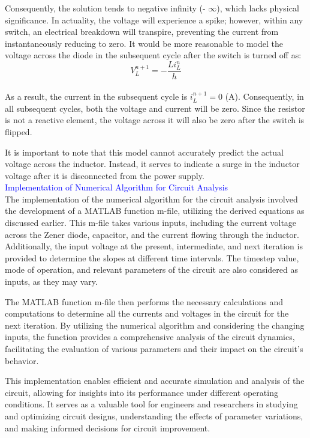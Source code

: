 Consequently, the solution tends to negative infinity (- $\infty$), which lacks physical significance. In actuality, the voltage will experience a spike; however, within any switch, an electrical breakdown will transpire, preventing the current from instantaneously reducing to zero. It would be more reasonable to model the voltage across the diode in the subsequent cycle after the switch is turned off as:\\

\begin{equation}
    V^{n+1}_L = -\frac{Li^{n}_L}{h}
\end{equation}\\

As a result, the current in the subsequent cycle is $i_L^{n+1} = 0$ (A). Consequently, in all subsequent cycles, both the voltage and current will be zero. Since the resistor is not a reactive element, the voltage across it will also be zero after the switch is flipped.

It is important to note that this model cannot accurately predict the actual voltage across the inductor. Instead, it serves to indicate a surge in the inductor voltage after it is disconnected from the power supply.\\

\textcolor{blue}{Implementation of Numerical Algorithm for Circuit Analysis}\\

The implementation of the numerical algorithm for the circuit analysis involved the development of a MATLAB function m-file, utilizing the derived equations as discussed earlier. This m-file takes various inputs, including the current voltage across the Zener diode, capacitor, and the current flowing through the inductor. Additionally, the input voltage at the present, intermediate, and next iteration is provided to determine the slopes at different time intervals. The timestep value, mode of operation, and relevant parameters of the circuit are also considered as inputs, as they may vary.

The MATLAB function m-file then performs the necessary calculations and computations to determine all the currents and voltages in the circuit for the next iteration. By utilizing the numerical algorithm and considering the changing inputs, the function provides a comprehensive analysis of the circuit dynamics, facilitating the evaluation of various parameters and their impact on the circuit's behavior.

This implementation enables efficient and accurate simulation and analysis of the circuit, allowing for insights into its performance under different operating conditions. It serves as a valuable tool for engineers and researchers in studying and optimizing circuit designs, understanding the effects of parameter variations, and making informed decisions for circuit improvement.\\

